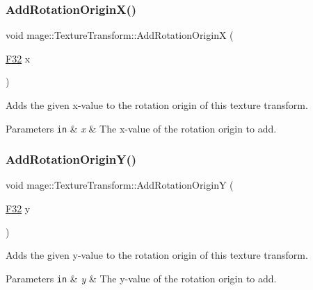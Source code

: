 \subsubsection{\texorpdfstring{Add\+Rotation\+Origin\+X()}{AddRotationOriginX()}}
{\footnotesize\ttfamily void mage\+::\+Texture\+Transform\+::\+Add\+Rotation\+OriginX (\begin{DoxyParamCaption}\item[{\mbox{\hyperlink{namespacemage_aa97e833b45f06d60a0a9c4fc22ae02c0}{F32}}}]{x }\end{DoxyParamCaption})\hspace{0.3cm}{\ttfamily [noexcept]}}

Adds the given x-\/value to the rotation origin of this texture transform.


\begin{DoxyParams}[1]{Parameters}
\mbox{\tt in}  & {\em x} & The x-\/value of the rotation origin to add. \\
\hline
\end{DoxyParams}
\mbox{\label{classmage_1_1_texture_transform_a5d3dd574b9471f4ae1162819abc394bf}} 
\subsubsection{\texorpdfstring{Add\+Rotation\+Origin\+Y()}{AddRotationOriginY()}}
{\footnotesize\ttfamily void mage\+::\+Texture\+Transform\+::\+Add\+Rotation\+OriginY (\begin{DoxyParamCaption}\item[{\mbox{\hyperlink{namespacemage_aa97e833b45f06d60a0a9c4fc22ae02c0}{F32}}}]{y }\end{DoxyParamCaption})\hspace{0.3cm}{\ttfamily [noexcept]}}

Adds the given y-\/value to the rotation origin of this texture transform.


\begin{DoxyParams}[1]{Parameters}
\mbox{\tt in}  & {\em y} & The y-\/value of the rotation origin to add. \\
\hline
\end{DoxyParams}
\mbox{\label{classmage_1_1_texture_transform_a494965e060dd40a1c86f5493d734c1a7}} 
